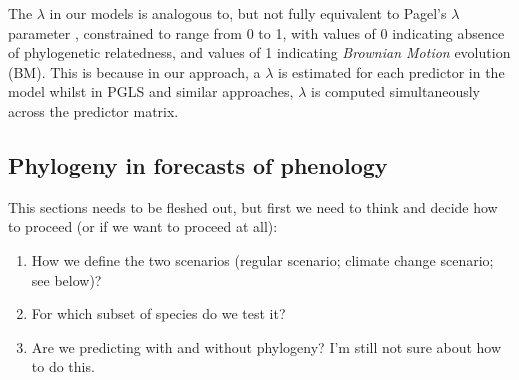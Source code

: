 \documentclass{article}\usepackage[]{graphicx}\usepackage[]{color}
\begin{document}
The $\lambda$ in our models is analogous to, but not fully equivalent to Pagel's \cite{pagel1999inferring} $\lambda$ parameter \citep{housworth2004phylogenetic}, constrained to range from 0 to 1, with values of 0 indicating absence of phylogenetic relatedness, and values of 1 indicating \emph{Brownian Motion} evolution (BM). This is because in our approach, a $\lambda$  is estimated for each predictor in the model whilst in PGLS and similar approaches, $\lambda$ is computed simultaneously across the predictor matrix. 








\subsection*{Phylogeny in forecasts of phenology}
This sections needs to be fleshed out, but first we need to think and decide how to proceed (or if we want to proceed at all):

\begin{enumerate}

\item How we define the two scenarios (regular scenario; climate change scenario; see below)?
\item For which subset of species do we test it?
\item Are we predicting with and without phylogeny? I'm still not sure about how to do this.

\end{enumerate}
\end{document}
